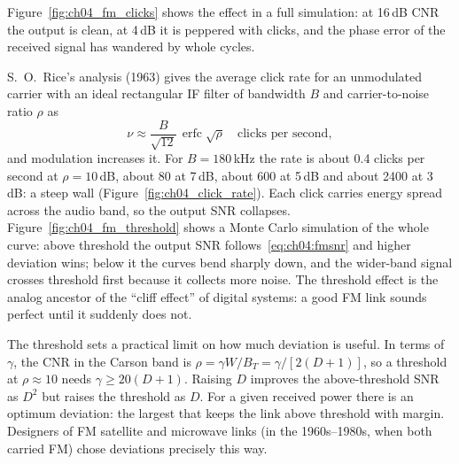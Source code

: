 Figure~\ref{fig:ch04_fm_clicks} shows the effect in a full simulation: at 16\,dB CNR the output is clean, at
4\,dB it is peppered with clicks, and the phase error of the received signal has wandered by whole cycles.



S.~O.~Rice's analysis (1963) gives the average click rate for an unmodulated carrier with an ideal
rectangular IF filter of bandwidth $B$ and carrier-to-noise ratio $\rho$ as
\begin{equation}
\nu\approx\frac{B}{\sqrt{12}}\,\operatorname{erfc}\sqrt{\rho}\quad\text{clicks per second},
\label{eq:ch04:rice}
\end{equation}
and modulation increases it. For $B=180$\,kHz the rate is about 0.4 clicks per second at $\rho=10$\,dB, about
80 at 7\,dB, about 600 at 5\,dB and about 2400 at 3\,dB: a steep wall (Figure~\ref{fig:ch04_click_rate}). Each
click carries energy spread across the audio band, so the output SNR collapses.
Figure~\ref{fig:ch04_fm_threshold} shows a Monte Carlo simulation of the whole curve: above threshold the
output SNR follows~\eqref{eq:ch04:fmsnr} and higher deviation wins; below it the curves bend sharply down,
and the wider-band signal crosses threshold first because it collects more noise. The threshold effect is
the analog ancestor of the ``cliff effect'' of digital systems: a good FM link sounds perfect until it
suddenly does not.


The threshold sets a practical limit on how much deviation is useful. In terms of $\gamma$, the CNR in the
Carson band is $\rho=\gamma W/B_T=\gamma/[2(D+1)]$, so a threshold at $\rho\approx10$ needs
$\gamma\ge20(D+1)$. Raising $D$ improves the above-threshold SNR as $D^2$ but raises the threshold as $D$.
For a given received power there is an optimum deviation: the largest that keeps the link above threshold
with margin. Designers of FM satellite and microwave links (in the 1960s--1980s, when both carried FM) chose
deviations precisely this way.


